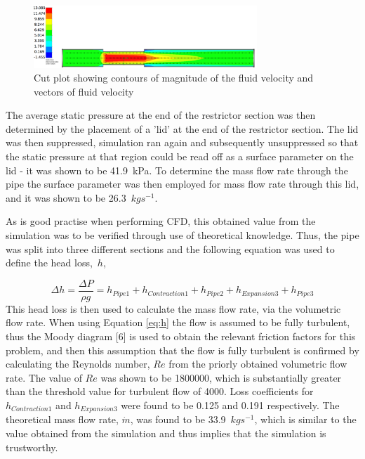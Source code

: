 \documentclass[a4paper,11pt,onecolumn]{article}
\begin{document}
\begin{figure}
\centering
    	\includegraphics[width=0.75\textwidth]{q8.png}
    	\caption{Cut plot showing contours of magnitude of the fluid velocity and
vectors of fluid velocity}
\label{fig:q8}
\end{figure}

The average static pressure at the end of the restrictor section was then
determined by the placement of a 'lid' at the end of the restrictor section.
The
lid was then suppressed, simulation ran again and subsequently unsuppressed
so that the static pressure at that region could be read off as a surface
parameter on the lid - it was shown to be 41.9~kPa. To determine the mass
flow rate through the pipe the surface parameter was then employed for mass
flow
rate through this lid, and it was shown to be 26.3~$kgs^{-1}$.

As is good practise when performing CFD, this obtained value from the
simulation was to be verified through use of theoretical knowledge. Thus, the
pipe was split into three different sections and the following equation was
used
to
define the head loss,~$h$,

\begin{equation}
    \Delta h = \frac{\Delta P}{\rho g} = h_{Pipe1} + h_{Contraction1} +
h_{Pipe2} + h_{Expansion3} + h_{Pipe3}
\label{eq:h}
\end{equation}
This head loss is then used to calculate the mass flow rate, via the volumetric
flow rate. When using Equation \ref{eq:h} the flow is assumed to be fully
turbulent, thus the Moody diagram [6] is used to obtain the relevant
friction factors for this problem, and then this assumption that the flow is
fully turbulent is confirmed by calculating the Reynolds number, $Re$ from the
priorly obtained volumetric flow rate. The value of $Re$ was shown to be
1800000, which is substantially greater than the threshold value for turbulent
flow of 4000. Loss coefficients for $h_{Contraction1}$ and $h_{Expansion3}$
were found to be 0.125 and 0.191 respectively. The theoretical mass flow rate,
$\dot{m}$, was found to be 33.9~$kgs^{-1}$, which is similar to the value
obtained from the simulation and thus implies that the simulation is
trustworthy.
\end{document}
